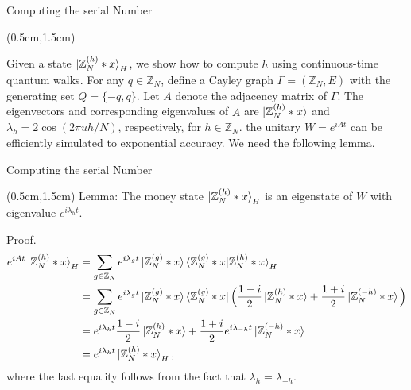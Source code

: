 \documentclass{beamer}
\theoremstyle{definition}
\begin{document}
\begin{frame}{Computing the serial Number}

    \begin{textblock*}{12cm}(0.5cm,1.5cm)

        Given a state $\ket{\mathbb{Z}_N^{(h)} * x}_H$, we show how to compute $h$ using continuous-time quantum walks. For any $q \in \mathbb{Z}_N$, define a Cayley graph $\Gamma = (\mathbb{Z}_N, E)$ with the generating set $Q = \{-q, q\}$. Let $A$ denote the adjacency matrix of $\Gamma$. The eigenvectors and corresponding eigenvalues of $A$ are $\ket{\mathbb{Z}_N^{(h)} * x}$ and $\lambda_h = 2\cos(2\pi uh / N)$, respectively, for $h \in \mathbb{Z}_N$. the unitary $W = e^{iAt}$ can be efficiently simulated to exponential accuracy. We need the following lemma.
        
    \end{textblock*}

 \end{frame}



\begin{frame}{Computing the serial Number}

    \begin{textblock*}{12cm}(0.5cm,1.5cm)
        Lemma: The money state $\ket{\mathbb{Z}_N^{(h)} * x}_H$ is an eigenstate of $W$ with eigenvalue $e^{i\lambda_h t}$.
        \vspace{1cm}
        

        Proof. 
        \begin{align*}
            e^{iAt} \ket{\mathbb{Z}_N^{(h)} * x}_H
            & = \sum_{g \in \mathbb{Z}_N} e^{i\lambda_gt} \ket{\mathbb{Z}_N^{(g)} * x}\braket{\mathbb{Z}_N^{(g)} * x|\mathbb{Z}_N^{(h)} * x}_H \\
            & = \sum_{g \in \mathbb{Z}_N} e^{i\lambda_gt} \ket{\mathbb{Z}_N^{(g)} * x} \bra{\mathbb{Z}_N^{(g)} * x} \Big( \frac{1 - i}{2} \ket{\mathbb{Z}_N^{(h)} * x} + \frac{1 + i}{2} \ket{\mathbb{Z}_N^{(-h)} * x} \Big) \\
            & = e^{i\lambda_{h}t} \frac{1 - i}{2} \ket{\mathbb{Z}_N^{(h)} * x} + \frac{1 + i}{2} e^{i\lambda_{-h}t} \ket{\mathbb{Z}_N^{(-h)} * x} \\
            & = e^{i\lambda_{h}t} \ket{\mathbb{Z}_N^{(h)} * x}_H,
        \end{align*}
        where the last equality follows from the fact that $\lambda_h = \lambda_{-h}$.
    \end{textblock*}

 \end{frame}



 

\end{document}
